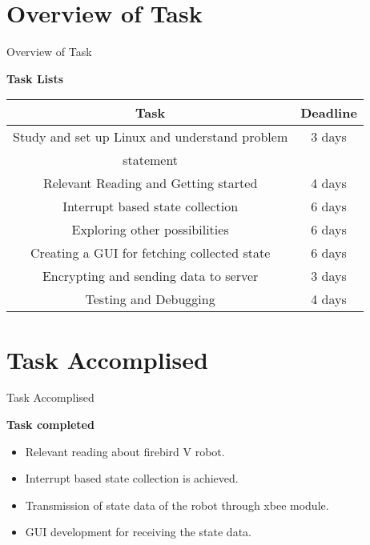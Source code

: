 \documentclass[10pt, a4paper]{beamer}
\begin{document}
\section{Overview of Task}
\begin{frame}{Overview of Task}
\begin{flushleft}
 {\Large \bf Task Lists}\\
 \vspace{0.1in}
\begin{tabular}{|c|c|}
\hline
Task & \hspace{0.1in}Deadline\hspace{0.1in} \\
\hline
Study and set up Linux and understand problem  & 3 days\\
statement &     \\
\hline
Relevant Reading and Getting started &  4 days\\
\hline
Interrupt based state collection & 6 days\\
\hline
Exploring other possibilities & 6 days \\
\hline
Creating a GUI for fetching collected state & 6 days\\
\hline
Encrypting and sending data to server & 3 days\\
\hline
Testing and Debugging & 4 days\\
\hline
\end{tabular}
\end{flushleft}
\end{frame}
\section{Task Accomplised}
\begin{frame}{Task Accomplised}
\begin{flushleft}
{\Large \bf Task completed}\\
	\begin{itemize}
       \item Relevant reading about firebird V robot.
	   \item Interrupt based state collection is achieved.
       \item Transmission of state data of the robot through xbee module.
       \item GUI development for receiving the state data.
\end{itemize}
\end{flushleft}
\end{frame}
\end{document}
